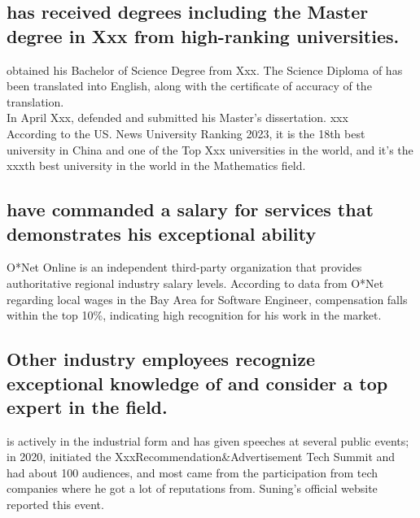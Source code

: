 \documentclass[11pt]{article}
\begin{document}
\subsection{\dr has received degrees including the Master degree in Xxx from high-ranking universities.}
\label{degree}


\dr obtained his Bachelor of Science Degree from Xxx. The Science Diploma of \dr has been translated into English, along with the certificate of accuracy of the translation. \cite{bachelor} \\


In April Xxx, \dr defended and submitted his Master's dissertation. xxx \\

According to the US. News University Ranking 2023, it is the 18th best university in China and one of the Top Xxx universities in the world, and it's the xxxth best university in the world in the Mathematics field. \cite{schoolrank} \cite{schoolrank2}



\subsection{\dr have commanded a salary for services that demonstrates his exceptional ability}
\label{compensation}



O*Net Online is an independent third-party organization that provides authoritative regional industry salary levels. According to data from O*Net regarding local wages in the Bay Area for Software Engineer, \drs compensation falls within the top 10\%, indicating high recognition for his work in the market. \cite{onetwage} \\


\subsection{Other industry employees recognize \drs exceptional knowledge of \fie{} and consider \dr a top expert in the field.}
\label{conference}

\dr is actively in the industrial form and has given speeches at several public events; in 2020, \dr initiated the XxxRecommendation\&Advertisement Tech Summit and had about 100 audiences, and most came from the \fie{} participation from tech companies where he got a lot of reputations from. Suning's official website reported this event. \cite{summit} \\
\end{document}
